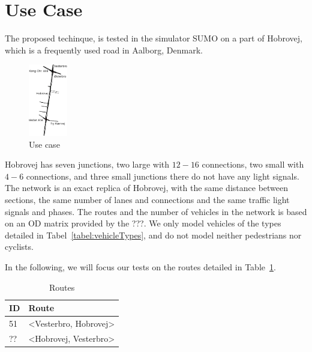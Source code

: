 \section{Use Case}
The proposed techinque, \tech is tested in the simulator SUMO on a part of Hobrovej, which is a frequently used road in Aalborg, Denmark.

\begin{figure}[htb]
\centering
\includegraphics[width=0.15\textwidth]{images/Hobrovej.png}
\caption{Use case}
\label{fig:Introduction:hobro}
\end{figure}

Hobrovej has seven junctions, two large with $12-16$ connections, two small with $4-6$ connections, and three small junctions there do not have any light signals.
The network is an exact replica of Hobrovej, with the same distance between sections, the same number of lanes and connections and the same traffic light signals and phases.
The routes and the number of vehicles in the network is based on an OD matrix provided by the ???.
We only model vehicles of the types detailed in Tabel~\ref{tabel:vehicleTypes}, and do not model neither pedestrians nor cyclists.

In the following, we will focus our tests on the routes detailed in Table~\ref{tb:useCase:routes}.
\begin{table} %
\centering
\begin{tabular}{|l|l|}\hline
\textbf{ID} & \textbf{Route}\\\hline
51 & <Vesterbro, Hobrovej>\\\hline
?? & <Hobrovej, Vesterbro>\\\hline
\end{tabular}
\caption{Routes}\label{tb:useCase:routes}
\end{table}